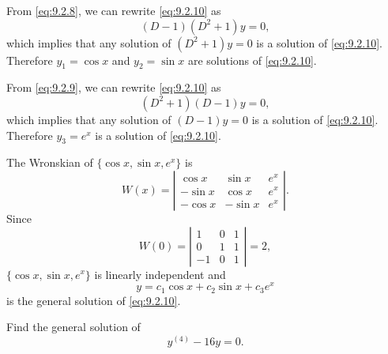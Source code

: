 \begin{examplesolution}
\solution From \eqref{eq:9.2.8}, we can rewrite \eqref{eq:9.2.10} as
\[
  (D-1)(D^{2}+1)y=0,
\]
which implies that any solution of $(D^{2}+1)y=0$ is a solution of \eqref{eq:9.2.10}. Therefore
$y_{1}=\cos x$ and $y_{2}=\sin x$ are solutions of \eqref{eq:9.2.10}.

From \eqref{eq:9.2.9}, we can rewrite \eqref{eq:9.2.10} as
\[
  (D^{2}+1)(D-1)y=0,
\]
which implies that any solution of $(D-1)y=0$ is a solution of \eqref{eq:9.2.10}. Therefore
$y_{3}=e^{x}$ is a solution of \eqref{eq:9.2.10}.

The Wronskian of $\{\cos x,\sin x,e^{x}\}$ is
\[
  W(x)=\left|
  \begin{array}{rrr}
    \cos x  & \sin x  & e^{x} \\
    -\sin x & \cos x  & e^{x} \\
    -\cos x & -\sin x & e^{x}
  \end{array}\right|.
\]
Since
\[
  W(0)=\left|
  \begin{array}{rrr}
    1  & 0 & 1 \\
    0  & 1 & 1 \\
    -1 & 0 & 1
  \end{array}\right|=2,
\]
$\{\cos x,\sin x,e^{x}\}$ is linearly independent and
\[
  y=c_{1}\cos x+c_{2}\sin x+c_{3}e^{x}
\]
is the general solution of \eqref{eq:9.2.10}.
\end{examplesolution}

\begin{example}
  \label{example:9.2.4} \rm Find the general solution of
  \begin{equation}
    \label{eq:9.2.11}y^{(4)}-16y=0.
  \end{equation}
\end{example}

